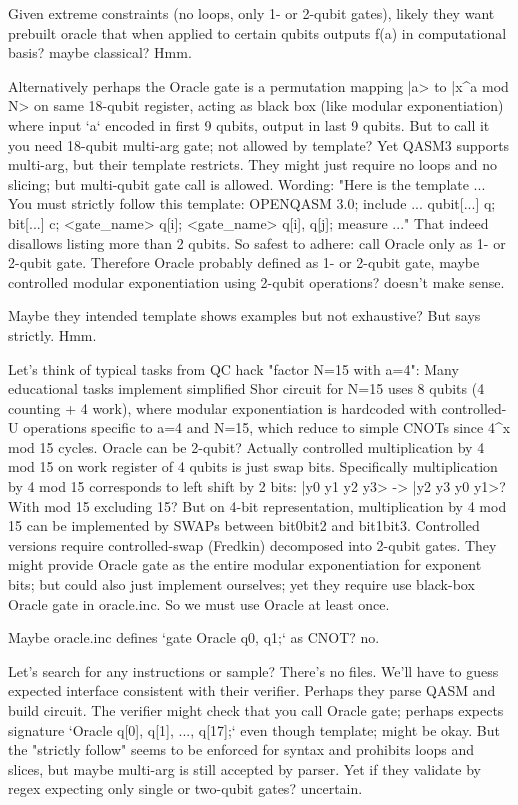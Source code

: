 \begin{decodedreasoningpanel}
Given extreme constraints (no loops, only 1- or 2-qubit gates), likely they want prebuilt oracle that when applied to certain qubits outputs f(a) in computational basis? maybe classical? Hmm.

Alternatively perhaps the Oracle gate is a permutation mapping |a> to |x\textasciicircum{}a mod N> on same 18-qubit register, acting as black box (like modular exponentiation) where input `a` encoded in first 9 qubits, output in last 9 qubits. But to call it you need 18-qubit multi-arg gate; not allowed by template? Yet QASM3 supports multi-arg, but their template restricts. They might just require no loops and no slicing; but multi-qubit gate call is allowed. Wording: "Here is the template ... You must strictly follow this template: OPENQASM 3.0; include ... qubit[...] q; bit[...] c; <gate\_name> q[i]; <gate\_name> q[i], q[j]; measure ..." That indeed disallows listing more than 2 qubits. So safest to adhere: call Oracle only as 1- or 2-qubit gate. Therefore Oracle probably defined as 1- or 2-qubit gate, maybe controlled modular exponentiation using 2-qubit operations? doesn't make sense.

Maybe they intended template shows examples but not exhaustive? But says strictly. Hmm.

Let's think of typical tasks from QC hack "factor N=15 with a=4": Many educational tasks implement simplified Shor circuit for N=15 uses 8 qubits (4 counting + 4 work), where modular exponentiation is hardcoded with controlled-U operations specific to a=4 and N=15, which reduce to simple CNOTs since 4\textasciicircum{}x mod 15 cycles. Oracle can be 2-qubit? Actually controlled multiplication by 4 mod 15 on work register of 4 qubits is just swap bits. Specifically multiplication by 4 mod 15 corresponds to left shift by 2 bits: |y0 y1 y2 y3> -> |y2 y3 y0 y1>? With mod 15 excluding 15? But on 4-bit representation, multiplication by 4 mod 15 can be implemented by SWAPs between bit0bit2 and bit1bit3. Controlled versions require controlled-swap (Fredkin) decomposed into 2-qubit gates. They might provide Oracle gate as the entire modular exponentiation for exponent bits; but could also just implement ourselves; yet they require use black-box Oracle gate in oracle.inc. So we must use Oracle at least once.

Maybe oracle.inc defines `gate Oracle q0, q1;` as CNOT? no.

Let's search for any instructions or sample? There's no files. We'll have to guess expected interface consistent with their verifier. Perhaps they parse QASM and build circuit. The verifier might check that you call Oracle gate; perhaps expects signature `Oracle q[0], q[1], ..., q[17];` even though template; might be okay. But the "strictly follow" seems to be enforced for syntax and prohibits loops and slices, but maybe multi-arg is still accepted by parser. Yet if they validate by regex expecting only single or two-qubit gates? uncertain.


\end{decodedreasoningpanel}
